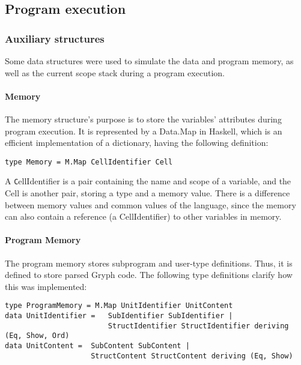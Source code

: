 \subsection{Program execution}

\subsubsection{Auxiliary structures}

Some data structures were used to simulate the data and
program memory, as well as the current scope stack
during a program execution.

\paragraph{Memory}

The memory structure's purpose is to store the variables'
attributes during program execution. It is represented
by a Data.Map in Haskell, which is an efficient implementation
of a dictionary, having the following definition:

\begin{lstlisting}[language=Gryph, basicstyle=\footnotesize]
type Memory = M.Map CellIdentifier Cell
\end{lstlisting}

A {\texttt CellIdentifier} is a pair containing
the name and scope of a variable, and the Cell
is another pair, storing a type and a memory value.
There is a difference between memory values and
common values of the language, since
the memory can also contain a reference (a CellIdentifier)
to other variables in memory.

\paragraph{Program Memory}

The program memory stores subprogram and user-type definitions.
Thus, it is defined to store parsed Gryph code. The
following type definitions clarify how this was
implemented:

\begin{lstlisting}[language=Gryph, basicstyle=\footnotesize]
type ProgramMemory = M.Map UnitIdentifier UnitContent
data UnitIdentifier =   SubIdentifier SubIdentifier | 
                        StructIdentifier StructIdentifier deriving (Eq, Show, Ord)
data UnitContent =  SubContent SubContent | 
                    StructContent StructContent deriving (Eq, Show)
\end{lstlisting}


